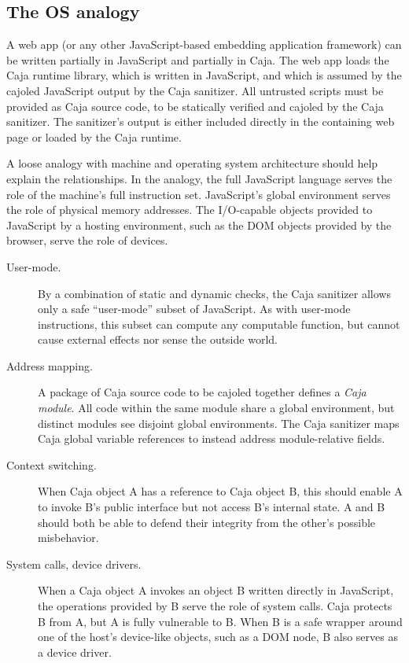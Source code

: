 \documentclass[letterpaper,twocolumn,10pt]{article}
\begin{document}
\subsection{The OS analogy}

A web app (or any other JavaScript-based embedding application framework) can 
be written partially in JavaScript and partially in Caja. The web app loads 
the Caja runtime library, which is written in JavaScript, and which is 
assumed by the cajoled JavaScript output by the Caja sanitizer. All 
untrusted scripts must be provided as Caja source code, to be statically 
verified and cajoled by the Caja sanitizer. The sanitizer's output is 
either included directly in the containing web page or loaded by the Caja 
runtime.

A loose analogy with machine and operating system architecture should help 
explain the relationships. In the analogy, the full JavaScript language 
serves the role of the machine's full instruction set. JavaScript's global 
environment serves the role of physical memory addresses. The I/O-capable 
objects provided to JavaScript by a hosting environment, such as the DOM 
objects provided by the browser, serve the role of devices.

\begin{description}

  \item[User-mode.] By a combination of static and dynamic checks, the Caja 
  sanitizer allows only a safe ``user-mode'' subset of JavaScript. As with 
  user-mode instructions, this subset can compute any computable function, 
  but cannot cause external effects nor sense the outside world.

  \item[Address mapping.] A package of Caja source code to be cajoled 
  together defines a \emph{Caja module}. All code within the same module 
  share a global environment, but distinct modules see disjoint global 
  environments. The Caja sanitizer maps Caja global variable references to 
  instead address module-relative fields.

  \item[Context switching.] When Caja object A has a reference to Caja 
  object B, this should enable A to invoke B's public interface but not 
  access B's internal state. A and B should both be able to defend their 
  integrity from the other's possible misbehavior.

  \item[System calls, device drivers.] When a Caja object A invokes an 
  object B written directly in JavaScript, the operations provided by B serve 
  the role of system calls. Caja protects B from A, but A is fully 
  vulnerable to B. When B is a safe wrapper around one of the host's 
  device-like objects, such as a DOM node, B also serves as a device driver.

\end{description}
\end{document}
